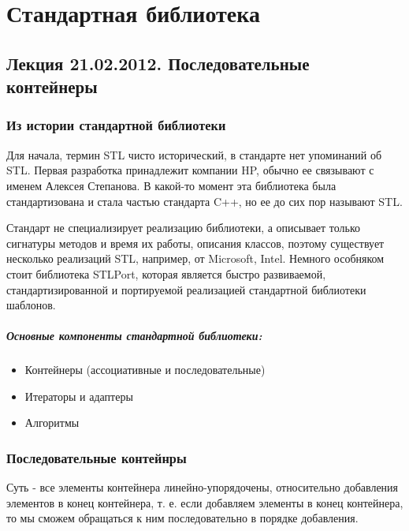 \chapter{Стандартная библиотека}

\section{Лекция 21.02.2012. Последовательные контейнеры}

\subsection{Из истории стандартной библиотеки}

Для начала, термин STL чисто исторический, в стандарте нет упоминаний об STL. Первая разработка принадлежит компании HP, обычно ее связывают с именем
Алексея Степанова. В какой-то момент эта библиотека была стандартизована и стала частью стандарта C++, но ее до сих пор называют STL.

Стандарт не специализирует реализацию библиотеки, а описывает только сигнатуры методов и время их работы, описания классов, поэтому существует несколько
реализаций STL, например, от Microsoft, Intel. Немного особняком стоит библиотека STLPort, которая является быстро развиваемой, стандартизированной и
портируемой реализацией стандартной библиотеки шаблонов.

\paragraph{Основные компоненты стандартной библиотеки:}
\begin{itemize}
\item Контейнеры (ассоциативные и последовательные)

\item Итераторы и адаптеры

\item Алгоритмы
\end{itemize}

\subsection{Последовательные контейнры}

Суть - все элементы контейнера линейно-упорядочены, относительно добавления элементов в конец контейнера, т. е. если добавляем элементы в конец контейнера,
то мы сможем обращаться к ним последовательно в порядке добавления.

